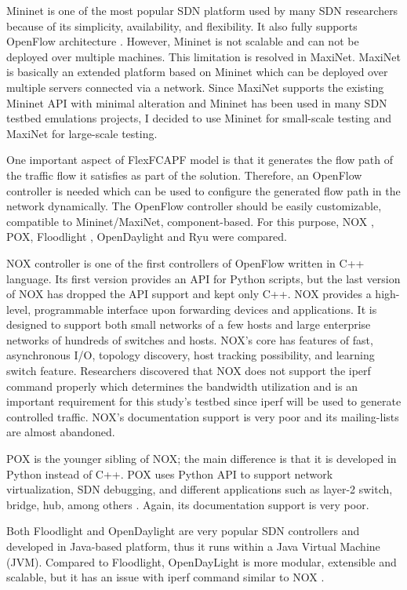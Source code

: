 Mininet is one of the most popular SDN platform used by many SDN researchers because of its simplicity, availability, and flexibility. It also fully supports OpenFlow architecture \cite{Lantz:2010:NLR:1868447.1868466}. However, Mininet is not scalable and can not be deployed over multiple machines. This limitation is resolved in MaxiNet. MaxiNet is basically an extended platform based on Mininet which can be deployed over multiple servers connected via a network. Since MaxiNet supports the existing Mininet API with minimal alteration and Mininet has been used in many SDN testbed emulations projects, I decided to use Mininet for small-scale testing and MaxiNet for large-scale testing.

One important aspect of FlexFCAPF model is that it generates the flow path of the traffic flow it satisfies as part of the solution. Therefore, an OpenFlow controller is needed which can be used to configure the generated flow path in the network dynamically. The OpenFlow controller should be easily customizable, compatible to Mininet/MaxiNet, component-based. For this purpose, NOX \cite{nox}, POX\cite{pox}, Floodlight \cite{floodlight}, OpenDaylight \cite{opendaylight} and Ryu \cite{ryu} were compared. 

NOX controller is one of the first controllers of OpenFlow written in C++ language. Its first version provides an API for Python scripts, but the last version of NOX has dropped the API support and kept only C++. NOX provides a high-level, programmable interface upon forwarding devices and applications. It is designed to support both small networks of a few hosts and large enterprise networks of hundreds of switches and hosts. NOX's core has features of fast, asynchronous I/O, topology discovery, host tracking possibility, and learning switch feature. Researchers discovered that NOX does not support the iperf command properly which determines the bandwidth utilization \cite{al2014survey} and is an important requirement for this study's testbed since iperf will be used to generate controlled traffic. NOX's documentation support is very poor and its mailing-lists are almost abandoned. 

POX is the younger sibling of NOX; the main difference is that it is developed in Python instead of C++. POX uses Python API to support network virtualization, SDN debugging, and different applications such as layer-2 switch, bridge, hub, among others \cite{al2014survey}. Again, its documentation support is very poor. 

Both Floodlight and OpenDaylight are very popular SDN controllers and developed in Java-based platform, thus it runs within a Java Virtual Machine (JVM). Compared to Floodlight, OpenDayLight is more modular, extensible and scalable, but it has an issue with iperf command similar to NOX \cite{al2014survey}. 

